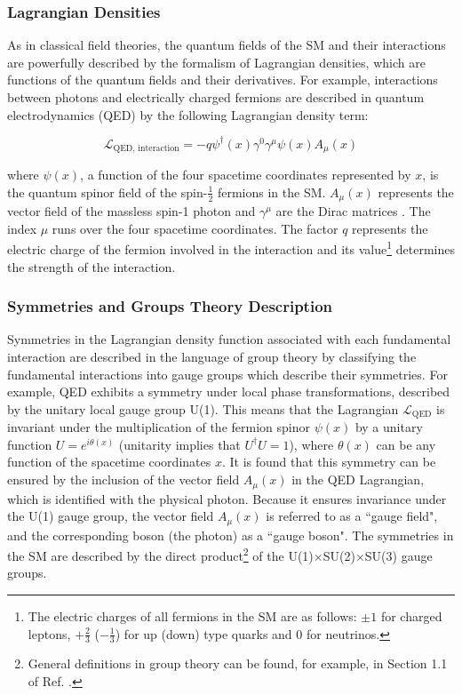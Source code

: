 \subsubsection{Lagrangian Densities}

As in classical field theories, the quantum fields of the SM and their interactions are powerfully described by the formalism of Lagrangian densities, which are functions of the quantum fields and their derivatives. For example, interactions between photons and electrically charged fermions are described in quantum electrodynamics (QED) by the following Lagrangian density term:

\begin{equation}
\label{eq:qed_interaction}
\mathcal{L}_\text{QED, interaction} = -q\psi^\dagger(x)\gamma^0\gamma^\mu\psi(x) A_\mu(x)
\end{equation}

\noindent where \(\psi(x)\), a function of the four spacetime coordinates represented by \(x\), is the quantum spinor field of the spin-\(\frac{1}{2}\) fermions in the SM. \(A_\mu(x)\) represents the vector field of the massless spin-1 photon and \(\gamma^\mu\) are the Dirac matrices \cite{griffiths_2008}. The index \(\mu\) runs over the four spacetime coordinates. The factor \(q\) represents the electric charge of the fermion involved in the interaction and its value\footnote{The electric charges of all fermions in the SM are as follows: \(\pm1\) for charged leptons, \(+\frac{2}{3}\) (\(-\frac{1}{3}\)) for up (down) type quarks and 0 for neutrinos.} determines the strength of the interaction. 

\subsubsection{Symmetries and Groups Theory Description}

Symmetries in the Lagrangian density function associated with each fundamental interaction are described in the language of group theory by classifying the fundamental interactions into gauge groups which describe their symmetries. For example, QED exhibits a symmetry under local phase transformations, described by the unitary local gauge group U(1). This means that the Lagrangian \(\mathcal{L}_\text{QED}\) is invariant under the multiplication of the fermion spinor \(\psi(x)\) by a unitary function \(U = e^{i\theta(x)}\) (unitarity implies that \(U^\dagger U=1\)),
where \(\theta(x)\) can be any function of the spacetime coordinates \(x\). It is found that this symmetry can be ensured by the inclusion of the vector field \(A_\mu(x)\) in the QED Lagrangian, which is identified with the physical photon. Because it ensures invariance under the U(1) gauge group, the vector field \(A_\mu(x)\) is referred to as a ``gauge field", and the corresponding boson (the photon) as a ``gauge boson". The symmetries in the SM are described by the direct product\footnote{General definitions in group theory can be found, for example, in Section 1.1 of Ref. \cite{costa2012symmetries}.} of the U(1)\(\times\)SU(2)\(\times\)SU(3) gauge groups. 

